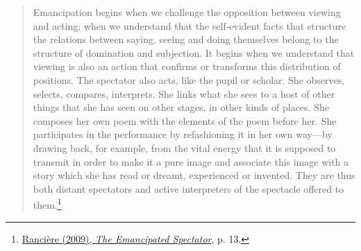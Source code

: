 \begin{quote}
Emancipation begins when we challenge the opposition between viewing and acting; when we understand that the self-evident facts that structure the relations between saying, seeing and doing themselves belong to the structure of domination and subjection. It begins when we understand that viewing is also an action that confirms or transforms this distribution of positions. The spectator also acts, like the pupil or scholar. She observes, selects, compares, interprets. She links what she sees to a host of other things that she has seen on other stages, in other kinds of places. She composes her own poem with the elements of the poem before her. She participates in the performance by refashioning it in her own way---by drawing back, for example, from the vital energy that it is supposed to transmit in order to make it a pure image and associate this image with a story which she has read or dreamt, experienced or invented. They are thus both distant spectators and active interpreters of the spectacle offered to them.\footnote{\hyperlink{ranspec}{Ranci\`{e}re (2009), \emph{The Emancipated Spectator}}, p. 13.}
\end{quote}

